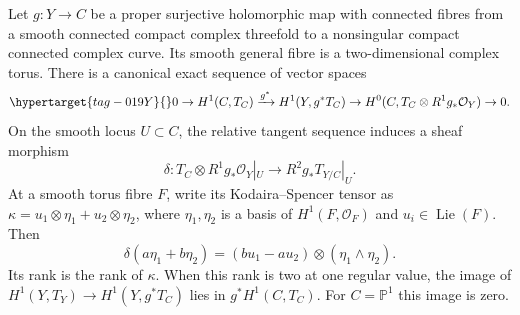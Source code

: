 \begin{proposition}\hypertarget{tag-01GU}{}\label{cdp:st:E5}


Let $g:Y\to C$ be a proper surjective holomorphic map with connected fibres
from a smooth connected compact complex threefold to a nonsingular compact
connected complex curve. Its smooth general fibre is a two-dimensional complex
torus. There is a canonical exact sequence of vector spaces
\begin{equation}\hypertarget{tag-019Y}{}\label{cdp:eq:E-Leray-map}
0\to H^1(C,T_C)\xrightarrow{g^*}H^1(Y,g^*T_C)
 \to H^0(C,T_C\otimes R^1g_*\mathcal O_Y)\to0.
\end{equation}
On the smooth locus $U\subset C$, the relative tangent sequence
induces a sheaf morphism
\[
 \delta:T_C\otimes R^1g_*\mathcal O_Y|_U
                  \longrightarrow R^2g_*T_{Y/C}|_U.
\]
At a smooth torus fibre $F$, write its Kodaira--Spencer tensor as
$\kappa=u_1\otimes\eta_1+u_2\otimes\eta_2$, where
$\eta_1,\eta_2$ is a basis of $H^1(F,\mathcal O_F)$ and
$u_i\in\operatorname{Lie}(F)$. Then
\[
 \delta(a\eta_1+b\eta_2)
   =(bu_1-au_2)\otimes(\eta_1\wedge\eta_2).
\]
Its rank is the rank of $\kappa$. When this rank is two at one
regular value, the image of $H^1(Y,T_Y)\to H^1(Y,g^*T_C)$ lies
in $g^*H^1(C,T_C)$. For $C=\mathbb P^1$ this image is zero.
\end{proposition}

